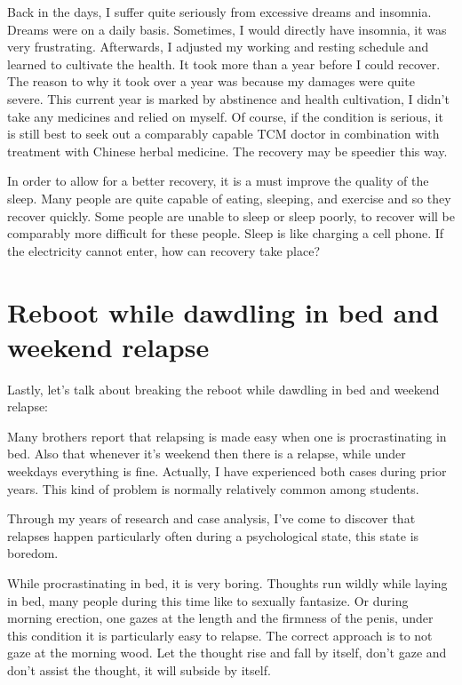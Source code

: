 \documentclass[
]{book}
\begin{document}
Back in the days, I suffer quite seriously from excessive dreams and insomnia. Dreams were on a daily basis. Sometimes, I would directly have insomnia, it was very frustrating. Afterwards, I adjusted my working and resting schedule and learned to cultivate the health. It took more than a year before I could recover. The reason to why it took over a year was because my damages were quite severe. This current year is marked by abstinence and health cultivation, I didn't take any medicines and relied on myself. Of course, if the condition is serious, it is still best to seek out a comparably capable TCM doctor in combination with treatment with Chinese herbal medicine. The recovery may be speedier this way.

In order to allow for a better recovery, it is a must improve the quality of the sleep. Many people are quite capable of eating, sleeping, and exercise and so they recover quickly. Some people are unable to sleep or sleep poorly, to recover will be comparably more difficult for these people. Sleep is like charging a cell phone. If the electricity cannot enter, how can recovery take place?

\hypertarget{reboot-while-dawdling-in-bed-and-weekend-relapse}{%
\section{Reboot while dawdling in bed and weekend relapse}\label{reboot-while-dawdling-in-bed-and-weekend-relapse}}

Lastly, let's talk about breaking the reboot while dawdling in bed and weekend relapse:

Many brothers report that relapsing is made easy when one is procrastinating in bed. Also that whenever it's weekend then there is a relapse, while under weekdays everything is fine. Actually, I have experienced both cases during prior years. This kind of problem is normally relatively common among students.

Through my years of research and case analysis, I've come to discover that relapses happen particularly often during a psychological state, this state is boredom.

While procrastinating in bed, it is very boring. Thoughts run wildly while laying in bed, many people during this time like to sexually fantasize. Or during morning erection, one gazes at the length and the firmness of the penis, under this condition it is particularly easy to relapse. The correct approach is to not gaze at the morning wood. Let the thought rise and fall by itself, don't gaze and don't assist the thought, it will subside by itself.
\end{document}
